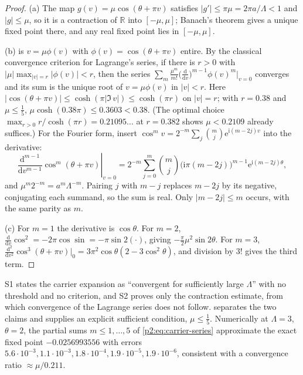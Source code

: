 \documentclass[11pt,a4paper,oneside]{book}
\theoremstyle{plain}
\theoremstyle{definition}
\theoremstyle{remark}
\newcommand{\Real}{\mathbb{R}}
\newcommand{\e}{\mathrm{e}}
\newcommand{\ii}{\mathrm{i}}
\newcommand{\dd}{\mathrm{d}}
\begin{document}
\begin{proof}
(a) The map \(g(v)=\mu\cos(\theta+\pi v)\) satisfies
\(|g'|\le\pi\mu=2\pi a/\Lambda<1\) and \(|g|\le\mu\), so it is a contraction of
\(\Real\) into \([-\mu,\mu]\); Banach's theorem gives a unique fixed point
there, and any real fixed point lies in \([-\mu,\mu]\).

(b)  is \(v=\mu\phi(v)\) with
\(\phi(v)=\cos(\theta+\pi v)\) entire.  By the classical convergence criterion
for Lagrange's series, if there is \(r>0\) with
\(|\mu|\max_{|v|=r}|\phi(v)|<r\), then the series
\(\sum_m\tfrac{\mu^m}{m!}\bigl(\tfrac{\dd}{\dd v}\bigr)^{m-1}\phi(v)^m|_{v=0}\)
converges and its sum is the unique root of \(v=\mu\phi(v)\) in \(|v|<r\).
Here \(|\cos(\theta+\pi v)|\le\cosh(\pi|{\Im}\,v|)\le\cosh(\pi r)\) on
\(|v|=r\); with \(r=0.38\) and \(\mu\le\tfrac15\),
\(\mu\cosh(0.38\pi)\le0.3603<0.38\).  (The optimal choice
\(\max_{r>0}r/\cosh(\pi r)=0.21095\ldots\) at \(r=0.382\) shows
\(\mu<0.2109\) already suffices.)  For the Fourier form, insert
\(\cos^m v=2^{-m}\sum_{j}\binom mj\e^{\ii(m-2j)v}\) into the derivative:
\[
 \left.\frac{\dd^{m-1}}{\dd v^{m-1}}\cos^m(\theta+\pi v)\right|_{v=0}
 =2^{-m}\sum_{j=0}^m\binom mj\bigl(\ii\pi(m-2j)\bigr)^{m-1}
 \e^{\ii(m-2j)\theta},
\]
and \(\mu^m2^{-m}=a^m\Lambda^{-m}\).  Pairing \(j\) with \(m-j\) replaces
\(m-2j\) by its negative, conjugating each summand, so the sum is real.  Only
\(|m-2j|\le m\) occurs, with the same parity as \(m\).

(c) For \(m=1\) the derivative is \(\cos\theta\).  For \(m=2\),
\(\tfrac{\dd}{\dd v}\cos^2=-2\pi\cos\sin=-\pi\sin2(\cdot)\), giving
\(-\tfrac\pi2\mu^2\sin2\theta\).  For \(m=3\),
\(\tfrac{\dd^2}{\dd v^2}\cos^3(\theta+\pi v)|_{0}
=3\pi^2\cos\theta(2-3\cos^2\theta)\), and division by \(3!\) gives the third
term.
\end{proof}

\begin{repairbox}
\textsf{S1} states the carrier expansion as ``convergent for sufficiently
large \(\Lambda\)'' with no threshold and no criterion, and \textsf{S2} proves
only the contraction estimate, from which convergence of the Lagrange series
does not follow.   separates the two claims and supplies
an explicit sufficient condition, \(\mu\le\tfrac15\).  Numerically at
\(\Lambda=3\), \(\theta=2\), the partial sums \(m\le1,\dots,5\) of
\cref{p2:eq:carrier-series} approximate the exact fixed point
\(-0.0256993556\) with errors
\(5.6\cdot10^{-3},1.1\cdot10^{-3},1.8\cdot10^{-4},1.9\cdot10^{-5},
1.9\cdot10^{-6}\), consistent with a convergence ratio \(\approx\mu/0.211\).
\end{repairbox}
\end{document}
